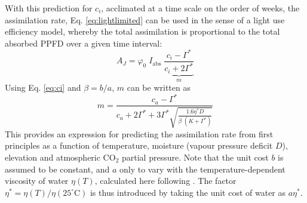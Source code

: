 \documentclass{myreport}
\begin{document}
With this prediction for $c_i$, acclimated at a time scale on the order of weeks, the assimilation rate, Eq. \ref{eq:lightlimited} can be used in the sense of a light use efficiency model, whereby the total assimilation is proportional to the total absorbed PPFD over a given time interval:
\begin{equation}
\label{eq:lue}
        A_J = \varphi_0 \; I_{\mathrm{abs}}\;\underbrace{\frac{c_i - \Gamma^{\ast}}{c_i + 2\Gamma^{\ast}}}_{m}
\end{equation}
Using Eq. \ref{eq:ci} and $\beta=b/a$, $m$ can be written as
\begin{equation}
    m = \frac{c_a - \Gamma^{\ast}}{c_a + 2 \Gamma^{\ast} + 3 \Gamma^{\ast} \sqrt{\frac{1.6 \eta^{\ast} D }{\beta\;(K+\Gamma^{\ast})}}}
\end{equation}
This provides an expression for predicting the assimilation rate from first principles as a function of temperature, moisture (vapour pressure deficit $D$), elevation and atmospheric CO$_2$ partial pressure. Note that the unit cost $b$ is assumed to be constant, and $a$ only to vary with the temperature-dependent viscosity of water $\eta(T)$, calculated here following \cite{huber09}. The factor $\eta^\ast = \eta(T) / \eta(25^{\circ}\text{C})$ is thus introduced by taking the unit cost of water as $a \eta^\ast$.
\end{document}
